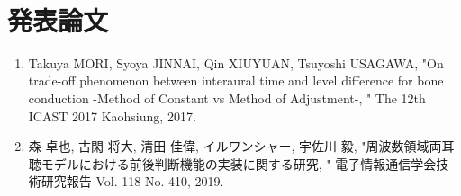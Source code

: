 ﻿	%
﻿\chapter*{発表論文}
\begin{enumerate}
\item
Takuya MORI, Syoya JINNAI, Qin XIUYUAN, Tsuyoshi USAGAWA, 
"On trade-off phenomenon between interaural time and level difference for bone conduction 
-Method of Constant vs Method of Adjustment-, " The 12th ICAST 2017 Kaohsiung, 2017.

\item
森 卓也, 古閑 将大, 清田 佳偉, イルワンシャー, 宇佐川 毅, "周波数領域両耳聴モデルにおける前後判断機能の実装に関する研究, " 電子情報通信学会技術研究報告 Vol. 118 No. 410, 2019.

\end{enumerate}
